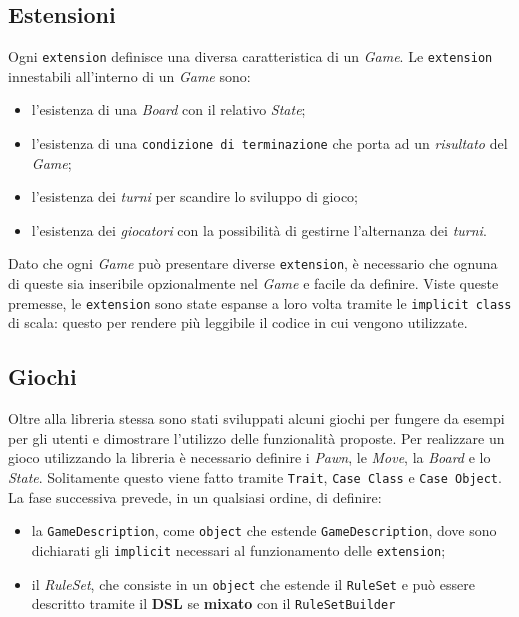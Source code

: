 
\subsection{Estensioni}
%
Ogni \texttt{extension} definisce una diversa caratteristica di un \textit{Game}.
%
Le \texttt{extension} innestabili all'interno di un \textit{Game} sono:
\begin{itemize}
  \item l'esistenza di una \textit{Board} con il relativo \textit{State};
  \item l'esistenza di una \texttt{condizione di terminazione} che porta ad un \textit{risultato} del \textit{Game};
  \item l'esistenza dei \textit{turni} per scandire lo sviluppo di gioco;
  \item l'esistenza dei \textit{giocatori} con la possibilità di gestirne l'alternanza dei \textit{turni}.
\end{itemize}
%
Dato che ogni \textit{Game} può presentare diverse \texttt{extension}, è necessario che ognuna di queste sia inseribile opzionalmente nel \textit{Game} e facile da definire.
%
Viste queste premesse, le \texttt{extension} sono state espanse a loro volta tramite le \texttt{implicit class} di scala: questo per rendere più leggibile il codice in cui vengono utilizzate.
%

\subsection{Giochi}
Oltre alla libreria stessa sono stati sviluppati alcuni giochi per fungere da esempi per gli utenti e dimostrare l'utilizzo delle funzionalità proposte.
%
Per realizzare un gioco utilizzando la libreria è necessario definire i \textit{Pawn}, le \textit{Move}, la \textit{Board} e lo \textit{State}.%
%
Solitamente questo viene fatto tramite \texttt{Trait}, \texttt{Case Class} e \texttt{Case Object}.
%
La fase successiva prevede, in un qualsiasi ordine, di definire:
\begin{itemize}
  \item la \texttt{GameDescription}, come \texttt{object} che estende \texttt{GameDescription}, dove sono dichiarati gli \texttt{implicit} necessari al funzionamento delle \texttt{extension};
  \item il \textit{RuleSet}, che consiste in un \texttt{object} che estende il \texttt{RuleSet} e può essere descritto tramite il \textbf{DSL} se \textbf{mixato} con il \texttt{RuleSetBuilder}
\end{itemize}

